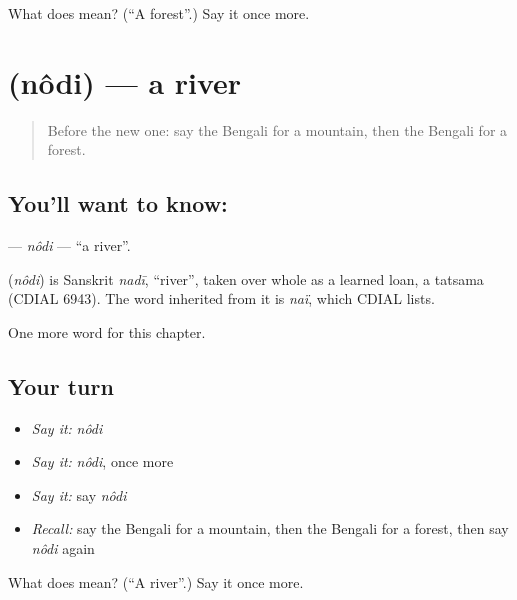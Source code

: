 \begin{tcolorbox}[breakable,colback=teal!4,colframe=teal!35!black,title={Before you move on}]
What does  mean? (\textquotedblleft{}A forest\textquotedblright{}.) Say it once more.
\end{tcolorbox}
\section[\texorpdfstring{\bn{নদী} (nôdi)}{নদী (nôdi)}]{ (nôdi) — a river}

\label{lesson:BN-C66-nodi}



\begin{quote}
Before the new one: say the Bengali for a mountain, then the Bengali for a forest.
\end{quote}

\subsection*{You'll want to know: }
\textbf{} — \emph{nôdi} — \textquotedblleft{}a river\textquotedblright{}.

\begin{cousinweb}
\textbf{} (\emph{nôdi}) is Sanskrit \emph{nadī}, \textquotedblleft{}river\textquotedblright{}, taken over whole as a learned loan, a tatsama (CDIAL 6943). The word inherited from it is \emph{naï}, which CDIAL lists.
\end{cousinweb}

\begin{grammarlens}[title={What you've built}]
One more word for this chapter.
\end{grammarlens}

\subsection*{Your turn}
\begin{itemize}
\raggedright
  \item \emph{Say it:} \emph{nôdi}
  \item \emph{Say it:} \emph{nôdi}, once more
  \item \emph{Say it:} say \emph{nôdi}
  \item \emph{Recall:} say the Bengali for a mountain, then the Bengali for a forest, then say \emph{nôdi} again
\end{itemize}

\begin{tcolorbox}[breakable,colback=teal!4,colframe=teal!35!black,title={Before you move on}]
What does  mean? (\textquotedblleft{}A river\textquotedblright{}.) Say it once more.
\end{tcolorbox}
